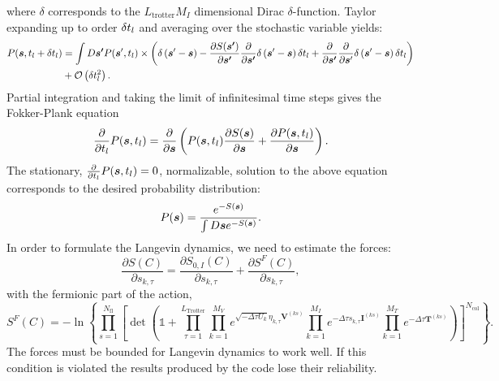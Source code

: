where $\delta$ corresponds to the $L_\mathrm{trotter} M_I $  dimensional Dirac $\delta$-function.   Taylor expanding  up to order $\delta t_{l}$  and averaging over the stochastic variable yields:
\begin{align}
P(\boldsymbol{s}, t_{l}  + \delta t_{l} ) &  = \int D\boldsymbol{s'}  P  (\boldsymbol{s}', t_{l}  )   \times \left(   \delta \left(  \boldsymbol{s}' - \boldsymbol{s}   \right)
- \frac{\partial S(\boldsymbol{s'}) }{\partial    \boldsymbol{s'} }   \frac{\partial  }{\partial    \boldsymbol{s'} } \delta \left(  \boldsymbol{s}' - \boldsymbol{s} \right)  \delta t_{l}   +
   \frac{\partial  }{\partial    \boldsymbol{s'} }   \frac{\partial  }{\partial    \boldsymbol{s}' }  \delta \left(  \boldsymbol{s}' - \boldsymbol{s}\right)    \delta t_{l}
\right)  \nonumber   \\
  &  + {\cal O}  \left(  \delta t_{l}^2 \right).
\end{align}
Partial integration  and taking the limit of infinitesimal time steps   gives the Fokker-Plank equation
\begin{equation}
         \frac{\partial  }{\partial   t_{l}}  P( \boldsymbol{s}, t_{l})  =  \frac{\partial  }{\partial    \boldsymbol{s} }  \left( P( \boldsymbol{s}, t_{l})  \frac{\partial S(\boldsymbol{s}) }{\partial     \boldsymbol{s} }   +
          \frac{\partial P(\boldsymbol{s},t_{l}) }{\partial     \boldsymbol{s} }
         \right) .
\end{equation}
The stationary,  $ \frac{\partial  }{\partial   t_{l}}  P( \boldsymbol{s}, t_{l}) =0$,  normalizable,  solution to the above equation corresponds to the desired probability distribution:
\begin{equation}
          P(\boldsymbol{s}) =  \frac{ e^{ - S(\boldsymbol{s}) } }   {   \int D \boldsymbol{s}  e^{ - S(\boldsymbol{s}) } }.
\end{equation}
In order to formulate  the Langevin dynamics, we need to estimate the forces:
\begin{equation}
	\frac { \partial S(C)}{\partial s_{k,\tau} } =\frac { \partial S_{0,I}(C)}{\partial s_{k,\tau} } +  \frac { \partial S^F(C)}{\partial s_{k,\tau} },
\end{equation}
with the fermionic part of the action,
\begin{equation}
S^F(C) = - \ln{ \left\{
  \prod_{s=1}^{N_{\mathrm{fl}}}\left[\det\left(  \mathds{1} + 
     \prod_{\tau=1}^{L_{\mathrm{Trotter}}}   
 \prod_{k=1}^{M_V}   e^{  \sqrt{ -\Delta \tau  U_k} \eta_{k,\tau} {\bm V}^{(ks)} }   \prod_{k=1}^{M_I}   e^{  -\Delta \tau s_{k,\tau}  {\bm I}^{(ks)}}  
     \prod_{k=1}^{M_T}   e^{-\Delta \tau {\bm T}^{(ks)}} 
     \right) \right]^{N_{\mathrm{col}}} \right\}} .
\end{equation} 
The forces must be bounded for Langevin dynamics to work well. If this condition is violated the results produced by the code lose their reliability. 

